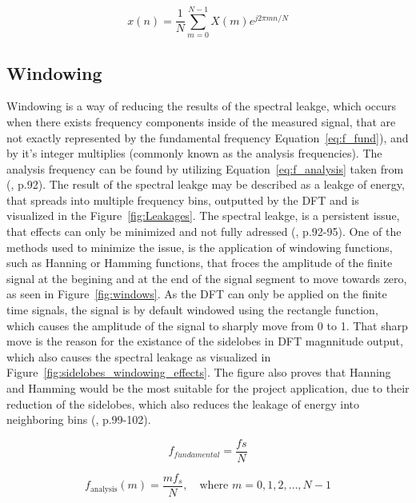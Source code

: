     \begin{equation}
    \label{eq:IDFT}
    x(n) = \frac{1}{N} \sum_{m=0}^{N-1} X(m) e^{j 2\pi m n / N}
\end{equation}

    \subsection{Windowing}
    \label{sec:Windowing}
    Windowing is a way of reducing the results of the spectral leakge, which occurs when there exists frequency components inside of the measured signal, that are not exactly represented by the fundamental frequency Equation~\ref{eq:f_fund}), and by it's integer multiplies (commonly known as the analysis frequencies). The analysis frequency can be found by utilizing Equation~\ref{eq:f_analysis} taken from (\cite{understanding_dsp}, p.92). The result of the spectral leakge may be described as a leakge of energy, that spreads into multiple frequency bins, outputted by the DFT and is visualized in the Figure~\ref{fig:Leakages}. The spectral leakge, is a persistent issue, that effects can only be minimized and not fully adressed (\cite{understanding_dsp}, p.92-95). One of the methods used to minimize the issue, is the application of windowing functions, such as Hanning or Hamming functions, that froces the amplitude of the finite signal at the begining and at the end of the signal segment to move towards zero, as seen in Figure~\ref{fig:windows}. As the DFT can only be applied on the finite time signals, the signal is by default windowed using the rectangle function, which causes the amplitude of the signal to sharply move from 0 to 1. That sharp move is the reason for the existance of the sidelobes in DFT magnnitude output, which also causes the spectral leakage as visualized in Figure~\ref{fig:sidelobes_windowing_effects}. The figure also proves that Hanning and Hamming would be the most suitable for the project application, due to their reduction of the sidelobes, which also reduces the leakage of energy into neighboring bins (\cite{understanding_dsp}, p.99-102).

\begin{equation}
\label{eq:f_fund}
    f_{fundamental} = \frac{fs}{N}
\end{equation}

\begin{equation}
\label{eq:f_analysis}
    f_{\text{analysis}}(m) = \frac{m f_s}{N}, \quad \text{where } m = 0,1,2,\ldots,N-1
\end{equation}
    
